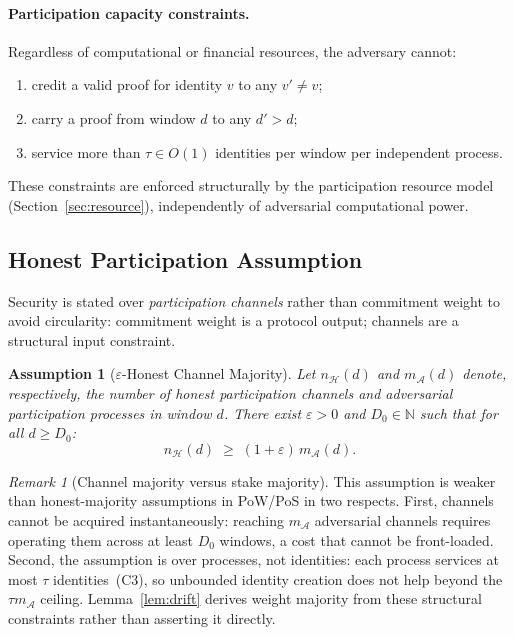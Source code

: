 \documentclass[10pt,journal,twoside]{IEEEtran}
\newtheorem{assumption}[theorem]{Assumption}
\theoremstyle{remark}
\newtheorem{remark}{Remark}[section]
\begin{document}
	\paragraph{Participation capacity constraints.}
	Regardless of computational or financial resources,
	the adversary cannot:
	\begin{enumerate}
		\item[\textbf{(C1)}] credit a valid proof for
		identity $v$ to any $v' \neq v$;
		\item[\textbf{(C2)}] carry a proof from window $d$
		to any $d' > d$;
		\item[\textbf{(C3)}] service more than $\tau \in O(1)$
		identities per window per independent process.
	\end{enumerate}
	These constraints are enforced structurally by the
	participation resource model (Section~\ref{sec:resource}),
	independently of adversarial computational power.
	
	\subsection{Honest Participation Assumption}
	\label{ssec:honest}
	
	Security is stated over \emph{participation channels}
	rather than commitment weight to avoid circularity:
	commitment weight is a protocol output; channels are a
	structural input constraint.
	
	\begin{assumption}[$\varepsilon$-Honest Channel Majority]
		\label{asm:majority}
		Let $n_{\mathcal{H}}(d)$ and $m_{\mathcal{A}}(d)$
		denote, respectively, the number of honest participation
		channels and adversarial participation processes in
		window $d$.
		There exist $\varepsilon > 0$ and
		$D_0 \in \mathbb{N}$ such that for all $d \geq D_0$:
		\[
		n_{\mathcal{H}}(d) \;\geq\; (1 + \varepsilon)\,
		m_{\mathcal{A}}(d).
		\]
	\end{assumption}
	
	\begin{remark}[Channel majority versus stake majority]
		\label{rem:majority_justified}
		This assumption is weaker than honest-majority
		assumptions in PoW/PoS in two respects.
		First, channels cannot be acquired instantaneously:
		reaching $m_{\mathcal{A}}$ adversarial channels requires
		operating them across at least $D_0$ windows, a cost
		that cannot be front-loaded.
		Second, the assumption is over processes, not identities:
		each process services at most $\tau$ identities~(C3),
		so unbounded identity creation does not help beyond
		the $\tau m_{\mathcal{A}}$ ceiling.
		Lemma~\ref{lem:drift} derives weight majority from
		these structural constraints rather than asserting it
		directly.
	\end{remark}
	
\end{document}
